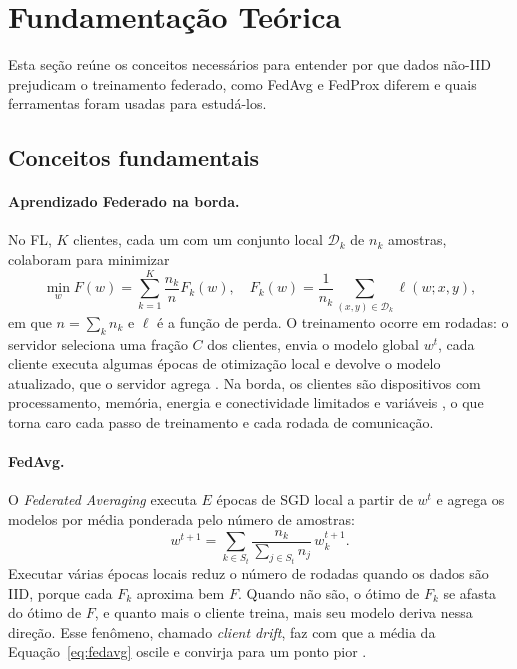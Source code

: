 \section{Fundamentação Teórica}
\label{sec:fundamentacao}

Esta seção reúne os conceitos necessários para entender por que dados não-IID prejudicam o treinamento federado, como FedAvg e FedProx diferem e quais ferramentas foram usadas para estudá-los.

\subsection{Conceitos fundamentais}

\paragraph{Aprendizado Federado na borda.}
No FL, $K$ clientes, cada um com um conjunto local $\mathcal{D}_k$ de $n_k$ amostras, colaboram para minimizar
\begin{equation}
    \min_{w} F(w) = \sum_{k=1}^{K} \frac{n_k}{n} F_k(w), \quad F_k(w) = \frac{1}{n_k}\sum_{(x,y)\in\mathcal{D}_k} \ell(w; x, y),
    \label{eq:objetivo}
\end{equation}
em que $n=\sum_k n_k$ e $\ell$ é a função de perda. O treinamento ocorre em rodadas: o servidor seleciona uma fração $C$ dos clientes, envia o modelo global $w^t$, cada cliente executa algumas épocas de otimização local e devolve o modelo atualizado, que o servidor agrega \citep{mcmahan2017fedavg}. Na borda, os clientes são dispositivos com processamento, memória, energia e conectividade limitados e variáveis \citep{lim2020mobileedge}, o que torna caro cada passo de treinamento e cada rodada de comunicação.

\paragraph{FedAvg.}
O \textit{Federated Averaging} \citep{mcmahan2017fedavg} executa $E$ épocas de SGD local a partir de $w^t$ e agrega os modelos por média ponderada pelo número de amostras:
\begin{equation}
    w^{t+1} = \sum_{k \in S_t} \frac{n_k}{\sum_{j\in S_t} n_j}\, w_k^{t+1}.
    \label{eq:fedavg}
\end{equation}
Executar várias épocas locais reduz o número de rodadas quando os dados são IID, porque cada $F_k$ aproxima bem $F$. Quando não são, o ótimo de $F_k$ se afasta do ótimo de $F$, e quanto mais o cliente treina, mais seu modelo deriva nessa direção. Esse fenômeno, chamado \textit{client drift}, faz com que a média da Equação~\eqref{eq:fedavg} oscile e convirja para um ponto pior \citep{zhao2018noniid, karimireddy2020scaffold}.

